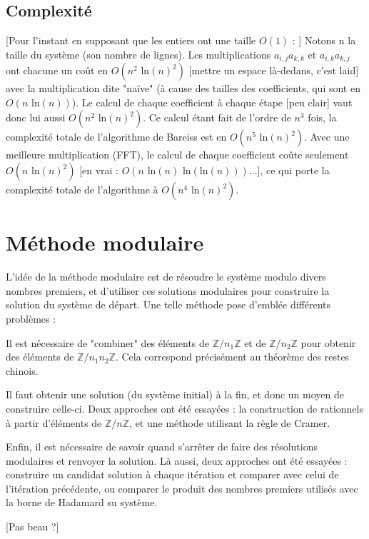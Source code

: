 \documentclass[french]{article}
\begin{document}
\subsection{Complexité}
[Pour l'instant en supposant que les entiers ont une taille $O(1)$ : ]
\newline
Notons n la taille du système (son nombre de lignes). Les multiplications $a_{i,j} a_{k,k}$ et $a_{i,k} a_{k,j}$ ont chacune un coût en $O(n^2 \mbox{ ln}(n)^2)$ [mettre un espace là-dedans, c'est laid] avec la multiplication dite "naïve" (à cause des tailles des coefficients, qui sont en $O(n \mbox{ ln}(n))$). Le calcul de chaque coefficient à chaque étape [peu clair] vaut donc lui aussi $O(n^2 \mbox{ ln}(n)^2)$. Ce calcul étant fait de l'ordre de $n^3$ fois, la complexité totale de l'algorithme de Bareiss est en $O(n^5 \mbox{ ln}(n)^2)$. Avec une meilleure multiplication (FFT), le calcul de chaque coefficient coûte seulement $O(n \mbox{ ln}(n)^2)$ [en vrai : $O(n \mbox{ ln}(n) \mbox{ ln}(\mbox{ln}(n)))$...], ce qui porte la complexité totale de l'algorithme à $O(n^4 \mbox{ ln}(n)^2)$.
\section{Méthode modulaire} \label{sec:modulaire}
L'idée de la méthode modulaire est de résoudre le système modulo divers nombres premiers, et d'utiliser ces solutions modulaires pour construire la solution du système de départ. Une telle méthode pose d'emblée différents problèmes :
\begin{description}
	\item Il est nécessaire de "combiner" des éléments de $\mathbb{Z}/n_1\mathbb{Z}$ et de $\mathbb{Z}/n_2\mathbb{Z}$ pour obtenir des éléments de $\mathbb{Z}/n_1n_2\mathbb{Z}$. Cela correspond précisément au théorème des restes chinois.
	\item Il faut obtenir une solution (du système initial) à la fin, et donc un moyen de construire celle-ci. Deux approches ont été essayées : la construction de rationnels à partir d'éléments de $\mathbb{Z}/n\mathbb{Z}$, et une méthode utilisant la règle de Cramer.
	\item Enfin, il est nécessaire de savoir quand s'arrêter de faire des résolutions modulaires et renvoyer la solution. Là aussi, deux approches ont été essayées : construire un candidat solution à chaque itération et comparer avec celui de l'itération précédente, ou comparer le produit des nombres premiers utilisés avec la borne de Hadamard su système.
\end{description}
[Pas beau ?]
\end{document}

